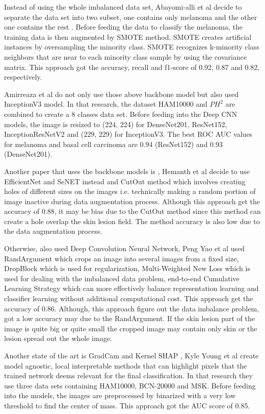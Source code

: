 \documentclass[sensors,article,submit,pdftex,moreauthors]{Definitions/mdpi}
\begin{document}
{Instead of using the whole imbalanced data set, Abayomi-alli et al decide to separate the data set into two subset, one contains only melanoma and the other one contains the rest \mbox{\cite{2101.133}}. Before feeding the data to classify the melanoma, the training data is then augmented by SMOTE method. SMOTE creates artificial instances by oversampling the minority class. SMOTE recognizes k-minority class neighbors that are near to each minority class sample by using the covariance matrix. This approach got the accuracy, recall and f1-score of 0.92, 0.87 and 0.82, respectively.

Amirreaza et al \mbox{\cite{10348}} do not only use those above backbone model but also used InceptionV3 \mbox{\cite{00567}} model. In that research, the dataset HAM10000 and $PH^2$ are combined to create a 8 classes data set. Before feeding into the Deep CNN models, the image is resized to (224, 224) for DenseNet201, ResNet152, InceptionResNetV2 and (229, 229) for InceptionV3. The best ROC AUC values for melanoma and basal cell carcinoma are 0.94 (ResNet152) and 0.93 (DenseNet201).

Another paper that uses the backbone models is \mbox{\cite{09418}}, Hemanth et al decide to use EfficientNet \mbox{\cite{11946}} and SeNET \mbox{\cite{01507}} instead and CutOut \mbox{\cite{04552v2}} method which involves creating holes of different sizes on the images i.e. technically making a random portion of image inactive during data augmentation process. Although this approach get the accuracy of 0.88, it may be bias due to the CutOut method since this method can create a hole overlap the skin lesion field. The method accuracy is also low due to the data augmentation process. 

Otherwise, \mbox{\cite{01284}} also used Deep Convolution Neural Network, Peng Yao et al used RandArgument which crops an image into several images from a fixed size, DropBlock which is used for regularization, Multi-Weighted New Loss which is used for dealing with the imbalanced data problem, end-to-end Cumulative Learning Strategy which can more effectively balance representation learning and classifier learning without additional computational cost. This approach get the accuracy of 0.86. Although, this approach figure out the data imbalance problem, got a low accuracy may due to the RandArgument. If the skin lesion part of the image is quite big or quite small the cropped image may contain only skin or the lesion spread out the whole image. 

Another state of the art is GradCam and Kernel SHAP \mbox{\cite{06612}}, Kyle Young et al create model agnostic, local interpretable methods that can highlight pixels that the trained network deems relevant for the final classification. In that research they use three data sets containing HAM10000, BCN-20000 and MSK. Before feeding into the models, the images are preprocessed by binarized with a very low threshold to find the center of mass. This approach got the AUC score of 0.85. 

}
\end{document}
